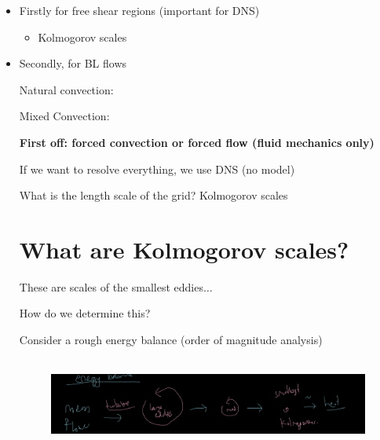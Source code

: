 \documentclass[12pt]{article}
\renewcommand{\_}{\kern-1.5pt\textunderscore\kern-1.5pt}
\begin{document}
\begin{itemize}
	\item Firstly for free shear regions (important for DNS)\par

\begin{itemize}
	\item Kolmogorov scales\par


\end{itemize}
	\item Secondly, for BL flows\par


\vspace{\baselineskip}
Natural convection:\par


\vspace{\baselineskip}
Mixed Convection:\par


\vspace{\baselineskip}
\textbf{First off: forced convection or forced flow (fluid mechanics only)}\par

If we want to resolve everything, we use DNS (no model)\par

What is the length scale of the grid?  Kolmogorov scales\par


\section{What are Kolmogorov scales?}
These are scales of the smallest eddies$ \ldots $ \par

How do we determine this?\par


\vspace{\baselineskip}
Consider a rough energy balance (order of magnitude analysis)\par




\begin{figure}[H]
	\begin{Center}
		\includegraphics[width=6.26in,height=1.19in]{./media/image1.png}
	\end{Center}
\end{figure}



\end{itemize}
\end{document}
